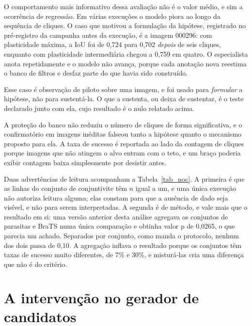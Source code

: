 O comportamento mais informativo dessa avaliação não é o valor médio, e sim a ocorrência de regressão. Em várias execuções o modelo piora ao longo da sequência de cliques. O caso que motivou a formulação da hipótese, registrado no pré-registro da campanha antes da execução, é a imagem 000296: com plasticidade máxima, a \ac{IoU} foi de 0,724 para 0,702 \emph{depois} de seis cliques, enquanto com plasticidade intermediária chegou a 0,759 em quatro. O especialista anota repetidamente e o modelo não avança, porque cada anotação nova reestima o banco de filtros e desfaz parte do que havia sido construído.

Esse caso é observação de piloto sobre uma imagem, e foi usado para \emph{formular} a hipótese, não para sustentá-la. O que a sustenta, ou deixa de sustentar, é o teste declarado junto com ela, cujo resultado é o nulo relatado acima.

A proteção do banco não reduziu o número de cliques de forma significativa, e o confirmatório em imagens inéditas falseou tanto a hipótese quanto o mecanismo proposto para ela. A taxa de sucesso é reportada ao lado da contagem de cliques porque imagens que não atingem o alvo entram com o teto, e um braço poderia exibir contagem baixa simplesmente por desistir antes.

\begin{table}[htb]
\centering
\caption{Confirmatório em imagens inéditas.}
\label{tab_noc_conf}

\end{table}



Duas advertências de leitura acompanham a Tabela~\ref{tab_noc}. A primeira é que as linhas do conjunto de conjuntivite têm $n$ igual a um, e uma única execução não autoriza leitura alguma; elas constam para que a ausência de dado seja visível, e não para serem interpretadas. A segunda é de método, e vale mais que o resultado em si: uma versão anterior desta análise agregava os conjuntos de parasitas e BraTS numa única comparação e obtinha valor p de 0,0265, o que parecia um achado. Separados por conjunto, como manda o protocolo, nenhum dos dois passa de 0,10. A agregação inflava o resultado porque os conjuntos têm taxas de sucesso muito diferentes, de 7\% e 30\%, e misturá-las cria uma diferença que não é do critério.

\section{A intervenção no gerador de candidatos}

